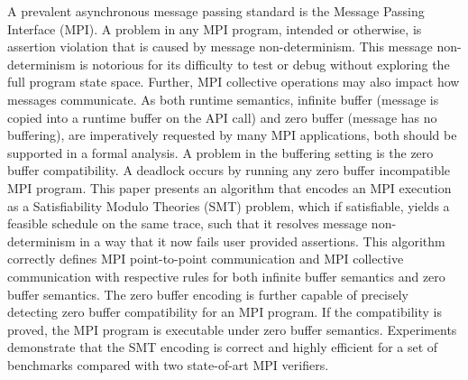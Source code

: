 %
A prevalent asynchronous message passing standard is the Message Passing Interface (MPI).
%
A problem in any MPI program, intended or otherwise, is assertion violation that is caused by message non-determinism.
%
This message non-determinism is notorious for its difficulty to test or debug without exploring the full program state space. 
%
Further, MPI collective operations may also impact how messages communicate.
%
As both runtime semantics, infinite buffer (message is copied into a runtime buffer on the API call) and zero buffer (message has no buffering), are imperatively requested by many MPI applications, both should be supported in a formal analysis.
%
A  problem in the buffering setting is the zero buffer compatibility. A deadlock occurs by running any zero buffer incompatible MPI program.
%
This paper presents an algorithm that encodes an MPI execution as a Satisfiability Modulo Theories (SMT) problem, which if satisfiable, yields a feasible schedule on the same trace, such that it resolves message non-determinism in a way that it now fails user provided assertions.
%
This algorithm correctly defines MPI point-to-point communication and MPI collective communication with respective rules for both infinite buffer semantics and zero buffer semantics. 
%
The zero buffer encoding is further capable of precisely detecting zero buffer compatibility for an MPI program. 
%
If the compatibility is proved, the MPI program is executable under zero buffer semantics.
%
Experiments demonstrate that the SMT encoding is correct and highly efficient for a set of benchmarks compared with two state-of-art MPI verifiers. 
%
